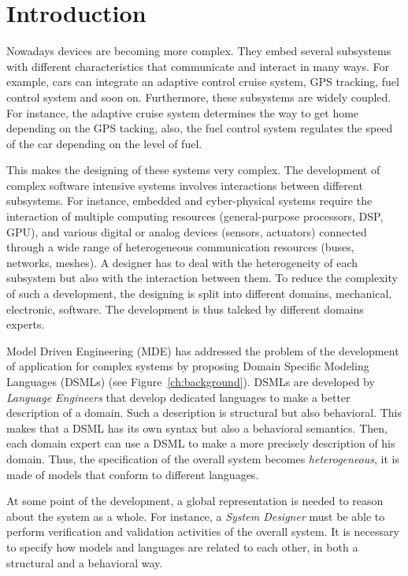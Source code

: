 \chapter{Introduction}	
Nowadays devices are becoming more complex. They embed several subsystems with different characteristics that communicate and interact in many ways. For example, cars can integrate an adaptive control cruise system, GPS tracking, fuel control system and soon on. Furthermore, these subsystems are widely coupled. For instance, the adaptive cruise system determines the way to get home depending on the GPS tacking, also, the fuel control system regulates the speed of the car depending on the level of fuel.

This makes the designing of these systems very complex. The development of complex software intensive systems involves interactions between different subsystems. For instance, embedded and cyber-physical systems require the interaction of multiple computing resources (general-purpose processors, DSP, GPU), and various digital or analog devices (sensors, actuators) connected through a wide range of heterogeneous communication resources (buses, networks, meshes).  A designer has to deal with the heterogeneity of each subsystem but also with the interaction between them. To reduce the complexity of such a development, the designing is split into different domains, \eg mechanical, electronic, software. The development is thus talcked by different domains experts.

Model Driven Engineering (MDE) has addressed the problem of the development of application for complex systems by proposing Domain Specific Modeling Languages (DSMLs) (see Figure~\ref{ch:background}). DSMLs are developed by \emph{Language Engineers} that develop dedicated languages to make a better description of a domain. Such a description is structural but also behavioral. This makes that a DSML has its own syntax but also a behavioral semantics. Then, each domain expert can use a DSML to make a more precisely description of his domain. Thus, the specification of the overall system becomes \emph{heterogeneous}, \ie it is made of models that conform to different languages.

At some point of the development, a global representation is needed to reason about the system as a whole. For instance, a \emph{System Designer} must be able to perform verification and validation activities of the overall system. It is necessary to specify how models and languages are related to each other, in both a structural and a behavioral way.

